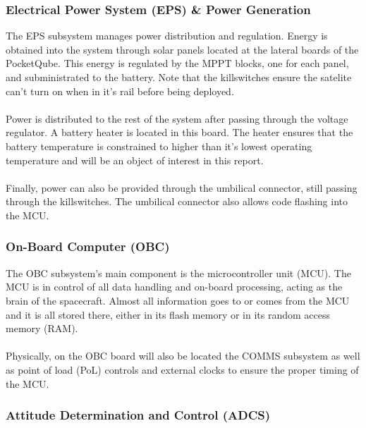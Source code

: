 \subsubsection{Electrical Power System (EPS) \& Power Generation}

The EPS subsystem manages power distribution and regulation.
Energy is obtained into the system through solar panels located 
at the lateral boards of the PocketQube. This energy is regulated 
by the MPPT blocks, one for each panel, and subministrated to the 
battery. Note that the killswitches ensure the satelite can't turn 
on when in it's rail before being deployed.
\paragraph{}
Power is distributed to the rest of the system after passing through 
the voltage regulator. A battery heater is located in this board. 
The heater ensures that the battery temperature is constrained to higher than 
it's lowest operating temperature and will be an object of interest in this report.
\paragraph{}
Finally, power can also be provided through the umbilical connector, still 
passing through the killswitches. The umbilical connector also allows code 
flashing into the MCU.

\subsubsection{On-Board Computer (OBC)}

The OBC subsystem's main component is the microcontroller unit (MCU). 
The MCU is in control of all data handling and on-board processing, 
acting as the brain of the spacecraft. Almost all information goes to 
or comes from the MCU and it is all stored there, either in its flash
memory or in its random access memory (RAM).
\paragraph{}
Physically, on the OBC board will also be located the COMMS subsystem as 
well as point of load (PoL) controls and external clocks to ensure the proper
 timing of the MCU.

\subsubsection{Attitude Determination and Control (ADCS)}


